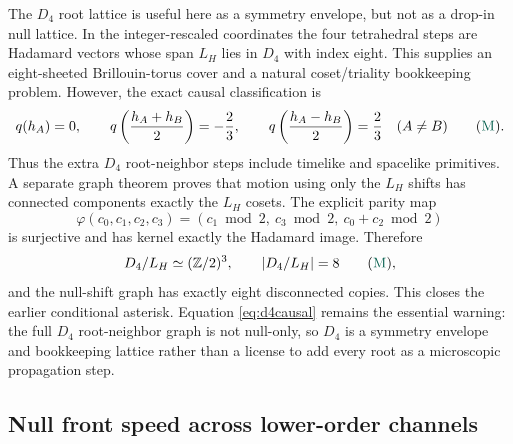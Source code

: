 \documentclass[11pt]{article}
\newcommand{\Mtag}{\textcolor{verified}{\textsc{M}}}
\newcommand{\Z}{\mathbb{Z}}
\begin{document}
The $D_4$ root lattice is useful here as a symmetry envelope, but not as a
drop-in null lattice.  In the integer-rescaled coordinates the four
tetrahedral steps are Hadamard vectors whose span $L_H$ lies in $D_4$ with
index eight.  This supplies an eight-sheeted Brillouin-torus cover and a
natural coset/triality bookkeeping problem.  However, the exact causal
classification is
\begin{equation}\label{eq:d4causal}
 q(h_A)=0,\qquad
 q\left(\frac{h_A+h_B}{2}\right)=-\frac23,\qquad
 q\left(\frac{h_A-h_B}{2}\right)=\frac23
 \quad(A\ne B)
 \qquad(\Mtag).
\end{equation}
Thus the extra $D_4$ root-neighbor steps include timelike and spacelike
primitives.  A separate graph theorem proves that motion using only the
$L_H$ shifts has connected components exactly the $L_H$ cosets.  The explicit
parity map
\begin{equation}\label{eq:d4quotient}
 \varphi(c_0,c_1,c_2,c_3)
  =(c_1\bmod2,\ c_3\bmod2,\ c_0+c_2\bmod2)
\end{equation}
is surjective and has kernel exactly the Hadamard image.  Therefore
\begin{equation}\label{eq:d4eight}
 D_4/L_H\simeq(\Z/2)^3,
 \qquad |D_4/L_H|=8
 \qquad(\Mtag),
\end{equation}
and the null-shift graph has exactly eight disconnected copies.  This closes
the earlier conditional asterisk.  Equation \eqref{eq:d4causal} remains the
essential warning: the full $D_4$ root-neighbor graph is not null-only, so
$D_4$ is a symmetry envelope and bookkeeping lattice rather than a license to
add every root as a microscopic propagation step.

\subsection{Null front speed across lower-order channels}
\end{document}
